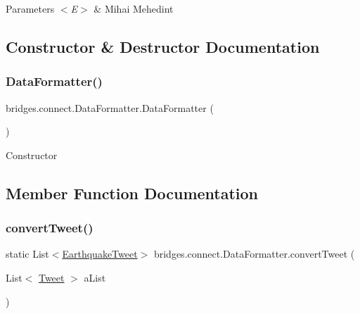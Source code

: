 \begin{DoxyParams}{Parameters}
{\em $<$\+E$>$} & Mihai Mehedint \\
\hline
\end{DoxyParams}


\subsection{Constructor \& Destructor Documentation}
\hypertarget{classbridges_1_1connect_1_1_data_formatter_a31efd2251e98942e58e743dff213ef27}{}\label{classbridges_1_1connect_1_1_data_formatter_a31efd2251e98942e58e743dff213ef27} 
\subsubsection{\texorpdfstring{Data\+Formatter()}{DataFormatter()}}
{\footnotesize\ttfamily bridges.\+connect.\+Data\+Formatter.\+Data\+Formatter (\begin{DoxyParamCaption}{ }\end{DoxyParamCaption})\hspace{0.3cm}{\ttfamily [protected]}}

Constructor 

\subsection{Member Function Documentation}
\hypertarget{classbridges_1_1connect_1_1_data_formatter_ad87ca06456fa4dc110e167e84f2d4447}{}\label{classbridges_1_1connect_1_1_data_formatter_ad87ca06456fa4dc110e167e84f2d4447} 
\subsubsection{\texorpdfstring{convert\+Tweet()}{convertTweet()}}
{\footnotesize\ttfamily static List$<$\hyperlink{classbridges_1_1data__src__dependent_1_1_earthquake_tweet}{Earthquake\+Tweet}$>$ bridges.\+connect.\+Data\+Formatter.\+convert\+Tweet (\begin{DoxyParamCaption}\item[{List$<$ \hyperlink{classbridges_1_1data__src__dependent_1_1_tweet}{Tweet} $>$}]{a\+List }\end{DoxyParamCaption})\hspace{0.3cm}{\ttfamily [static]}}

